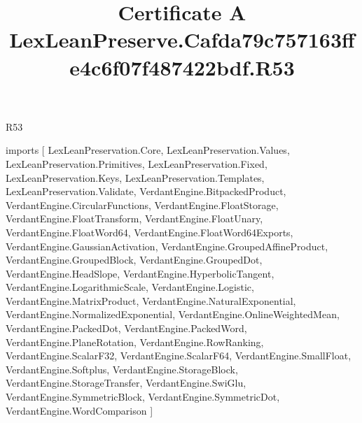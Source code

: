 \begin{lexlean}{R53}
\title{Certificate A LexLeanPreserve.Cafda79c757163ffe4c6f07f487422bdf.R53}
\begin{coremodule}
imports [
  LexLeanPreservation.Core,
  LexLeanPreservation.Values,
  LexLeanPreservation.Primitives,
  LexLeanPreservation.Fixed,
  LexLeanPreservation.Keys,
  LexLeanPreservation.Templates,
  LexLeanPreservation.Validate,
  VerdantEngine.BitpackedProduct,
  VerdantEngine.CircularFunctions,
  VerdantEngine.FloatStorage,
  VerdantEngine.FloatTransform,
  VerdantEngine.FloatUnary,
  VerdantEngine.FloatWord64,
  VerdantEngine.FloatWord64Exports,
  VerdantEngine.GaussianActivation,
  VerdantEngine.GroupedAffineProduct,
  VerdantEngine.GroupedBlock,
  VerdantEngine.GroupedDot,
  VerdantEngine.HeadSlope,
  VerdantEngine.HyperbolicTangent,
  VerdantEngine.LogarithmicScale,
  VerdantEngine.Logistic,
  VerdantEngine.MatrixProduct,
  VerdantEngine.NaturalExponential,
  VerdantEngine.NormalizedExponential,
  VerdantEngine.OnlineWeightedMean,
  VerdantEngine.PackedDot,
  VerdantEngine.PackedWord,
  VerdantEngine.PlaneRotation,
  VerdantEngine.RowRanking,
  VerdantEngine.ScalarF32,
  VerdantEngine.ScalarF64,
  VerdantEngine.SmallFloat,
  VerdantEngine.Softplus,
  VerdantEngine.StorageBlock,
  VerdantEngine.StorageTransfer,
  VerdantEngine.SwiGlu,
  VerdantEngine.SymmetricBlock,
  VerdantEngine.SymmetricDot,
  VerdantEngine.WordComparison
]


\end{coremodule}
\end{lexlean}
